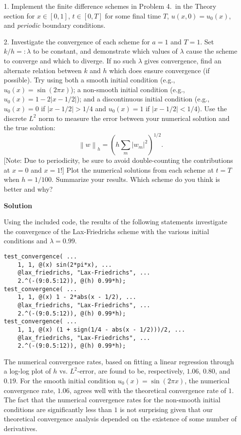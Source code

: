 \documentclass{article}
\providecommand{\abs}[1]{\left\lvert#1\right\rvert}
\providecommand{\norm}[1]{\left\lVert#1\right\rVert}
\begin{document}
\begin{itemize}

\item[1.] Implement the finite difference schemes in Problem 4.\ in the Theory section for $x \in [0,1]$, $t \in [0,T]$ for some final time $T$, $u(x,0) = u_0(x)$, and \emph{periodic} boundary conditions.

\item[2.] Investigate the convergence of each scheme for $a = 1$ and $T = 1$. Set $k/h =: \lambda$ to be constant, and demonstrate which values of $\lambda$ cause the scheme to converge and which to diverge. If no such $\lambda$ gives convergence, find an alternate relation between $k$ and $h$ which does ensure convergence (if possible). Try using both a smooth initial condition (e.g., $u_0(x) = \sin(2 \pi x)$); a non-smooth initial condition (e.g., $u_0(x) = 1 - 2 \abs{x - 1/2}$); and a discontinuous initial condition (e.g., $u_0(x) = 0$ if $\abs{x - 1/2} > 1/4$ and $u_0(x) = 1$ if $\abs{x - 1/2} < 1/4$). Use the discrete $L^2$ norm to measure the error between your numerical solution and the true solution:
\begin{equation*}
\norm{w}_h = \left( h \sum_m \abs{w_m}^2 \right)^{1/2}.
\end{equation*}
[Note: Due to periodicity, be sure to avoid double-counting the contributions at $x = 0$ and $x = 1$!] Plot the numerical solutions from each scheme at $t = T$ when $h = 1/100$. Summarize your results. Which scheme do you think is better and why?

\textbf{Solution}

Using the included code, the results of the following statements investigate the convergence of the Lax-Friedrichs scheme with the various initial conditions and $\lambda = 0.99$.
\begin{verbatim}
test_convergence( ...
    1, 1, @(x) sin(2*pi*x), ...
    @lax_friedrichs, "Lax-Friedrichs", ...
    2.^(-(9:0.5:12)), @(h) 0.99*h);
test_convergence( ...
    1, 1, @(x) 1 - 2*abs(x - 1/2), ...
    @lax_friedrichs, "Lax-Friedrichs", ...
    2.^(-(9:0.5:12)), @(h) 0.99*h);
test_convergence( ...
    1, 1, @(x) (1 + sign(1/4 - abs(x - 1/2)))/2, ...
    @lax_friedrichs, "Lax-Friedrichs", ...
    2.^(-(9:0.5:12)), @(h) 0.99*h);
\end{verbatim}
The numerical convergence rates, based on fitting a linear regression through a log-log plot of $h$ vs. $L^2$-error, are found to be, respectively, $1.06$, $0.80$, and $0.19$. For the smooth initial condition $u_0(x) = \sin(2 \pi x)$, the numerical convergence rate, $1.06$, agrees well with the theoretical convergence rate of $1$. The fact that the numerical convergence rates for the non-smooth initial conditions are significantly less than $1$ is not surprising given that our theoretical convergence analysis depended on the existence of some number of derivatives.


\end{itemize}
\end{document}

